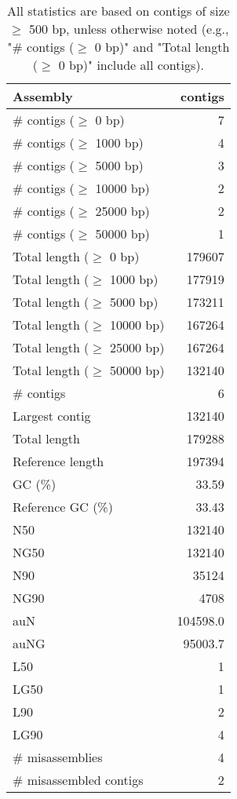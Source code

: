 \documentclass[12pt,a4paper]{article}
\begin{document}
\begin{table}[ht]
\begin{center}
\caption{All statistics are based on contigs of size $\geq$ 500 bp, unless otherwise noted (e.g., "\# contigs ($\geq$ 0 bp)" and "Total length ($\geq$ 0 bp)" include all contigs).}
\begin{tabular}{|l*{1}{|r}|}
\hline
Assembly & contigs \\ \hline
\# contigs ($\geq$ 0 bp) & 7 \\ \hline
\# contigs ($\geq$ 1000 bp) & 4 \\ \hline
\# contigs ($\geq$ 5000 bp) & 3 \\ \hline
\# contigs ($\geq$ 10000 bp) & 2 \\ \hline
\# contigs ($\geq$ 25000 bp) & 2 \\ \hline
\# contigs ($\geq$ 50000 bp) & 1 \\ \hline
Total length ($\geq$ 0 bp) & 179607 \\ \hline
Total length ($\geq$ 1000 bp) & 177919 \\ \hline
Total length ($\geq$ 5000 bp) & 173211 \\ \hline
Total length ($\geq$ 10000 bp) & 167264 \\ \hline
Total length ($\geq$ 25000 bp) & 167264 \\ \hline
Total length ($\geq$ 50000 bp) & 132140 \\ \hline
\# contigs & 6 \\ \hline
Largest contig & 132140 \\ \hline
Total length & 179288 \\ \hline
Reference length & 197394 \\ \hline
GC (\%) & 33.59 \\ \hline
Reference GC (\%) & 33.43 \\ \hline
N50 & 132140 \\ \hline
NG50 & 132140 \\ \hline
N90 & 35124 \\ \hline
NG90 & 4708 \\ \hline
auN & 104598.0 \\ \hline
auNG & 95003.7 \\ \hline
L50 & 1 \\ \hline
LG50 & 1 \\ \hline
L90 & 2 \\ \hline
LG90 & 4 \\ \hline
\# misassemblies & 4 \\ \hline
\# misassembled contigs & 2 \\ \hline

\end{tabular}
\end{center}
\end{table}
\end{document}
